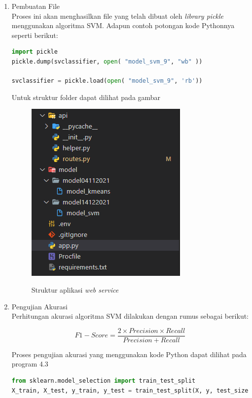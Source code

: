 \begin{enumerate} [1.]
	\item Pembuatan File
	      \\Proses ini akan menghasilkan file yang telah dibuat oleh \textit{library pickle} menggunakan algoritma SVM. Adapun contoh potongan kode Pythonnya seperti berikut:

	      \begin{lstlisting}[label=MinMAxdanPCA,language=Python]
import pickle
pickle.dump(svclassifier, open( "model_svm_9", "wb" ))

svclassifier = pickle.load(open( "model_svm_9", 'rb'))
		  \end{lstlisting}

	      \par Untuk struktur folder dapat dilihat pada gambar

	      \begin{figure}[H]
		      \center
		      \shadowbox
		      {\includegraphics [width=.4\textwidth]{gambar/strukturcodemodel.png}}
		      \caption{Struktur aplikasi \textit{web service}}
		      \label{usecasemapping}
	      \end{figure}

	\item Pengujian Akurasi
	      \\ Perhitungan akurasi algoritma SVM dilakukan dengan rumus sebagai berikut:

	      \begin{equation}
		      F1-Score = \frac{2 \times Precision \times Recall}{Precision+Recall}
	      \end{equation}
	      \vspace{0.1cm}

	      \par Proses pengujian akurasi yang menggunakan kode Python dapat dilihat pada program 4.3

	      \begin{lstlisting}[label=classifier,language=Python]
from sklearn.model_selection import train_test_split
X_train, X_test, y_train, y_test = train_test_split(X, y, test_size = 0.20)


\end{lstlisting}
\end{enumerate}
